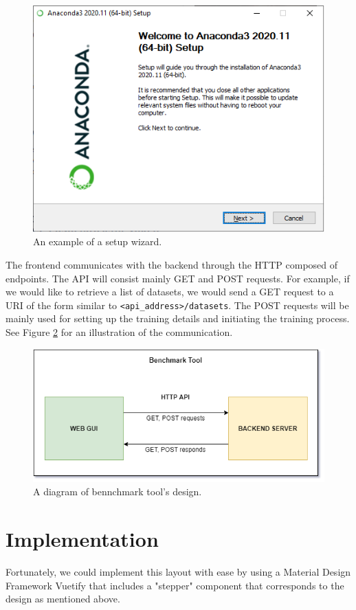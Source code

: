 \begin{figure}[h]
    \centering
    \includegraphics[width=0.65\linewidth]{Sources/Figures/anaconda.png}
    \caption{An example of a setup wizard.}
    \label{fig:wizard}
\end{figure}

The frontend communicates with the backend through the HTTP  composed of 
endpoints. The API will consist mainly GET and POST requests. For example, if we
would like to retrieve a list of datasets, we would send a GET request to a URI
of the form similar to \texttt{<api\_address>/datasets}. The POST requests will
be mainly used for setting up the training details and initiating the training
process. See Figure \ref{fig:tool_design} for an illustration of the communication.

\begin{figure}[h]
    \centering
    \includegraphics[width=0.85\linewidth]{Sources/Figures/tool_design.png}
    \caption{A diagram of bennchmark tool's design.}
    \label{fig:tool_design}
\end{figure}

\section{Implementation}
Fortunately, we could implement this layout with ease by using a Material Design
Framework Vuetify that includes a "stepper" component that corresponds to the
design as mentioned above.